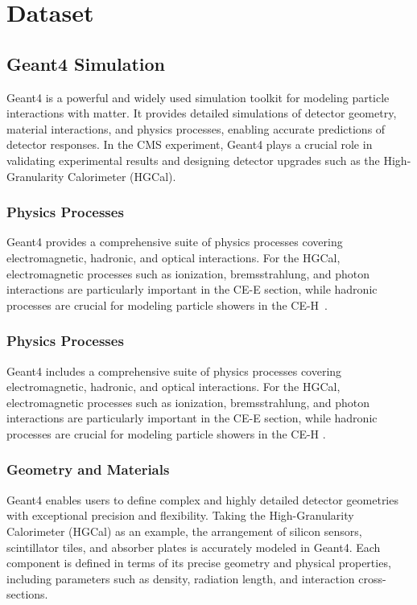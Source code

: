 \chapter{Dataset}

\section{Geant4 Simulation}

Geant4 is a powerful and widely used simulation toolkit for modeling particle interactions with matter. It provides detailed simulations of detector geometry, material interactions, and physics processes, enabling accurate predictions of detector responses. In the CMS experiment, Geant4 plays a crucial role in validating experimental results and designing detector upgrades such as the High-Granularity Calorimeter (HGCal).

\subsection{Physics Processes}

Geant4 provides a comprehensive suite of physics processes covering electromagnetic,
hadronic, and optical interactions. For the HGCal, electromagnetic processes such as
ionization, bremsstrahlung, and photon interactions are particularly important in the
CE-E section, while hadronic processes are crucial for modeling particle showers in
the CE-H~\cite{geant4_toolkit}.

\subsection{Physics Processes}

Geant4 includes a comprehensive suite of physics processes covering electromagnetic, hadronic, and optical interactions. For the HGCal, electromagnetic processes such as ionization, bremsstrahlung, and photon interactions are particularly important in the CE-E section, while hadronic processes are crucial for modeling particle showers in the CE-H \cite{geant4_toolkit}.

\subsection{Geometry and Materials}

Geant4 enables users to define complex and highly detailed detector geometries with exceptional precision and flexibility. Taking the High-Granularity Calorimeter (HGCal) as an example, the arrangement of silicon sensors, scintillator tiles, and absorber plates is accurately modeled in Geant4. Each component is defined in terms of its precise geometry and physical properties, including parameters such as density, radiation length, and interaction cross-sections.

